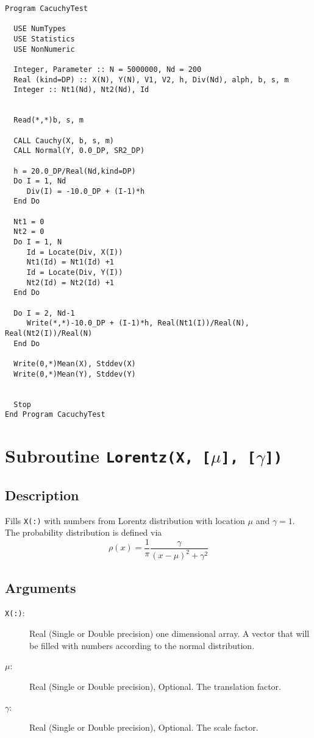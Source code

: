 \begin{lstlisting}[emph=Cauchy,
                   emphstyle=\color{blue},
                   frame=trBL,
                   caption=Obtaining numbers with a stable distribution.,
                   label=cauchy]
Program CacuchyTest

  USE NumTypes
  USE Statistics
  USE NonNumeric

  Integer, Parameter :: N = 5000000, Nd = 200
  Real (kind=DP) :: X(N), Y(N), V1, V2, h, Div(Nd), alph, b, s, m
  Integer :: Nt1(Nd), Nt2(Nd), Id
  

  Read(*,*)b, s, m
 
  CALL Cauchy(X, b, s, m)
  CALL Normal(Y, 0.0_DP, SR2_DP)

  h = 20.0_DP/Real(Nd,kind=DP)
  Do I = 1, Nd
     Div(I) = -10.0_DP + (I-1)*h
  End Do

  Nt1 = 0
  Nt2 = 0
  Do I = 1, N
     Id = Locate(Div, X(I))
     Nt1(Id) = Nt1(Id) +1
     Id = Locate(Div, Y(I))
     Nt2(Id) = Nt2(Id) +1
  End Do

  Do I = 2, Nd-1
     Write(*,*)-10.0_DP + (I-1)*h, Real(Nt1(I))/Real(N), Real(Nt2(I))/Real(N)
  End Do

  Write(0,*)Mean(X), Stddev(X)
  Write(0,*)Mean(Y), Stddev(Y)


  Stop
End Program CacuchyTest
\end{lstlisting}


\section{Subroutine \texttt{Lorentz(X, [$\mu$], [$\gamma$])}}

\subsection{Description}

Fills \texttt{X(:)} with numbers from Lorentz distribution with
location $\mu$ and $\gamma=1$. The probability 
distribution is defined via
\begin{equation}
  \rho(x) = \frac{1}{\pi} \frac{\gamma}{(x-\mu)^2 + \gamma^2}
\end{equation}

\subsection{Arguments}

\begin{description}
\item[\texttt{X(:)}:] Real (Single or Double precision) one
  dimensional array. A vector that will be filled with numbers
  according to the normal distribution.
\item[$\mu$:] Real (Single or Double precision), Optional. The 
  translation factor.
\item[$\gamma$:] Real (Single or Double precision), Optional. The 
  scale factor.
\end{description}

